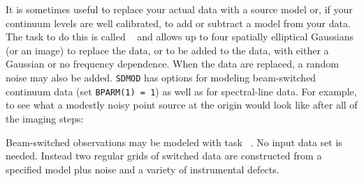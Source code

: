     It is sometimes useful to replace your actual data with a source
model or, if your continuum levels are well calibrated, to add or
subtract a model from your data.  The task to do this is called {\tt
{}} and allows up to four spatially elliptical Gaussians (or
an image) to replace the data, or to be added to the data, with either
a Gaussian or no frequency dependence.  When the data are replaced, a
random noise may also be added.  {\tt SDMOD} has options for modeling
beam-switched continuum data (set {\tt BPARM(1) = 1}) as well as for
spectral-line data.  For example, to see what a modestly noisy point
source at the origin would look like after all of the imaging steps:

Beam-switched observations may be modeled with task {\tt
{}}\@.  No input data set is needed.  Instead two regular
grids of switched data are constructed from a specified model plus
noise and a variety of instrumental defects.



